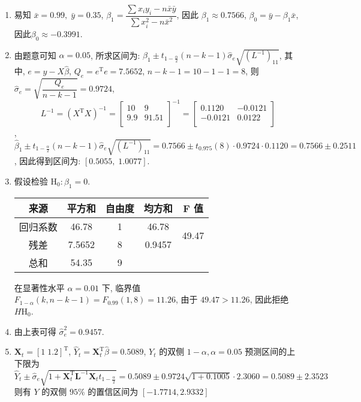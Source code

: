 \begin{enumerate}[(1)]
    \item 易知 $\bar{x}=0.99,\;\bar{y}=0.35$, $\beta_1=\dfrac{\sum x_iy_i-n\bar{x}\bar{y}}{\sum x_i^2-n\bar{x}^2}$, 因此 $\beta_1\approx 0.7566$, $\beta_0=\bar{y}-\beta_1\bar{x}$, 因此$\beta_0\approx -0.3991$.
    
    \item 由题意可知 $\alpha=0.05$, 所求区间为: $\beta_1\pm t_{1-\frac{\alpha}{2}}(n-k-1)\hat{\sigma}_e\sqrt{(L^{-1})_{11}}$, 其中, $e=y-X\hat{\beta}$, $Q_e=e^{\text{T}}e=7.5652$, $n-k-1=10-1-1=8$, 则 $\hat{\sigma}_{e}=\sqrt{\dfrac{Q_e}{n-k-1}}=0.9724$,
    $$
    L^{-1}=(X^{\text{T}}X)^{-1}=\begin{bmatrix}
        10&9\\
        9.9&91.51\\
    \end{bmatrix}^{-1}=\begin{bmatrix}
        0.1120&-0.0121\\
        -0.0121&0.0122\\
    \end{bmatrix}
    $$, $\hat{\beta}_1\pm t_{1-\frac{\alpha}{2}}(n-k-1)\hat{\sigma}_e\sqrt{(L^{-1})_{11}}=0.7566\pm t_{0.975}(8)\cdot 0.9724\cdot 0.1120=0.7566\pm0.2511$,
    因此得到区间为: $[0.5055,\;1.0077]$.
    \item 假设检验 $\text{H}_0:\beta_1=0$.
    
    \begin{center}
    \begin{tabular}{c|c|c|cc}
        \hline
        来源&平方和& 自由度 & \multicolumn{1}{c|}{均方和}   & F 值\\ \hline
        回归系数 & 46.78  & 1   & \multicolumn{1}{c|}{46.78}  & \multirow{2}{*}{49.47} \\
        残差   & 7.5652 & 8  & \multicolumn{1}{c|}{0.9457} &\\ \hline
        总和   & 54.35  & 9  &&\\ \hline
    \end{tabular}
    \end{center}
    \vspace{12pt}
    在显著性水平 $\alpha=0.01$ 下, 临界值 $F_{1-\alpha}(k,n-k-1)=F_{0.99}(1,8)=11.26$, 由于 $49.47>11.26$, 因此拒绝 $H\text{H}_0$.
    \item 由上表可得 $\hat{\sigma}_e^2=0.9457$.
    \item $\textbf{X}_t=[1\;1.2]^{\text{T}}$, 
    $\hat{Y}_t=\textbf{X}^{\text{T}}_t\hat{\beta}=0.5089$,
    $Y_t$ 的双侧 $1-\alpha,\alpha=0.05$ 预测区间的上下限为
    $\hat{Y}_t\pm \hat{\sigma}_e\sqrt{1+\textbf{X}_t^{\text{T}}\textbf{L}^{-1}\textbf{X}_tt_{1-\frac{\alpha}{2}}}=0.5089\pm 0.9724\sqrt{1+0.1005}\cdot2.3060=0.5089\pm 2.3523$
    则有 $Y$ 的双侧 $95\%$ 的置信区间为 $[-1.7714, 2.9332]$
        
\end{enumerate}


